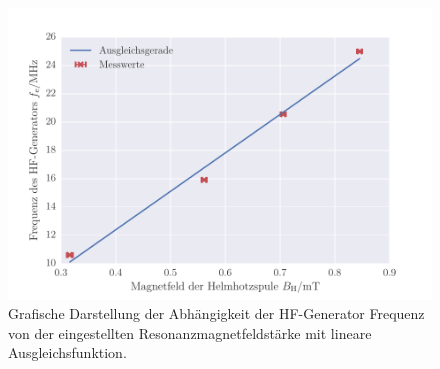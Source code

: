 \begin{figure}[!h]
 \centering
 \includegraphics[scale=1]{../Grafiken/Magenetfeld.pdf}
 \caption{Grafische Darstellung der Abhängigkeit der HF-Generator Frequenz von der eingestellten Resonanzmagnetfeldstärke mit lineare Ausgleichsfunktion. \label{fig:magnetfeld}}
 \end{figure} 